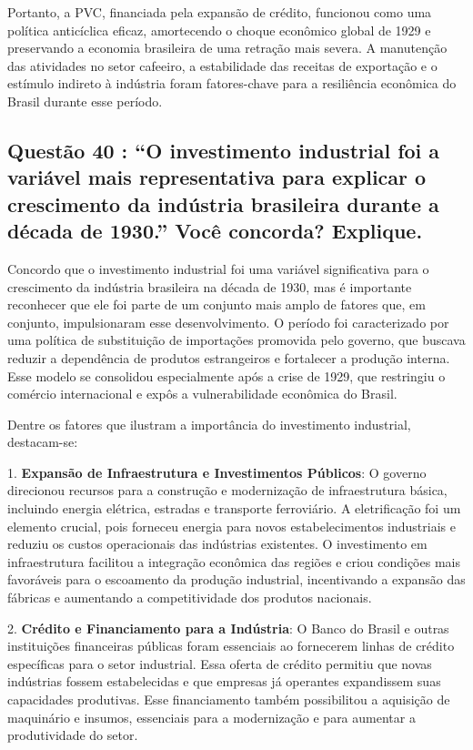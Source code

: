 \documentclass[a4paper,12pt]{article}[abntex2]
\begin{document}
Portanto, a PVC, financiada pela expansão de crédito, funcionou como uma política anticíclica eficaz, amortecendo o choque econômico global de 1929 e preservando a economia brasileira de uma retração mais severa. A manutenção das atividades no setor cafeeiro, a estabilidade das receitas de exportação e o estímulo indireto à indústria foram fatores-chave para a resiliência econômica do Brasil durante esse período.

\subsection{\textbf{Questão 40 : “O investimento industrial foi a variável mais representativa para explicar o crescimento da indústria brasileira durante a década de 1930.” Você concorda? Explique.}}

Concordo que o investimento industrial foi uma variável significativa para o crescimento da indústria brasileira na década de 1930, mas é importante reconhecer que ele foi parte de um conjunto mais amplo de fatores que, em conjunto, impulsionaram esse desenvolvimento. O período foi caracterizado por uma política de substituição de importações promovida pelo governo, que buscava reduzir a dependência de produtos estrangeiros e fortalecer a produção interna. Esse modelo se consolidou especialmente após a crise de 1929, que restringiu o comércio internacional e expôs a vulnerabilidade econômica do Brasil.

Dentre os fatores que ilustram a importância do investimento industrial, destacam-se:

1. \textbf{Expansão de Infraestrutura e Investimentos Públicos}: O governo direcionou recursos para a construção e modernização de infraestrutura básica, incluindo energia elétrica, estradas e transporte ferroviário. A eletrificação foi um elemento crucial, pois forneceu energia para novos estabelecimentos industriais e reduziu os custos operacionais das indústrias existentes. O investimento em infraestrutura facilitou a integração econômica das regiões e criou condições mais favoráveis para o escoamento da produção industrial, incentivando a expansão das fábricas e aumentando a competitividade dos produtos nacionais.

2. \textbf{Crédito e Financiamento para a Indústria}: O Banco do Brasil e outras instituições financeiras públicas foram essenciais ao fornecerem linhas de crédito específicas para o setor industrial. Essa oferta de crédito permitiu que novas indústrias fossem estabelecidas e que empresas já operantes expandissem suas capacidades produtivas. Esse financiamento também possibilitou a aquisição de maquinário e insumos, essenciais para a modernização e para aumentar a produtividade do setor.
\end{document}
